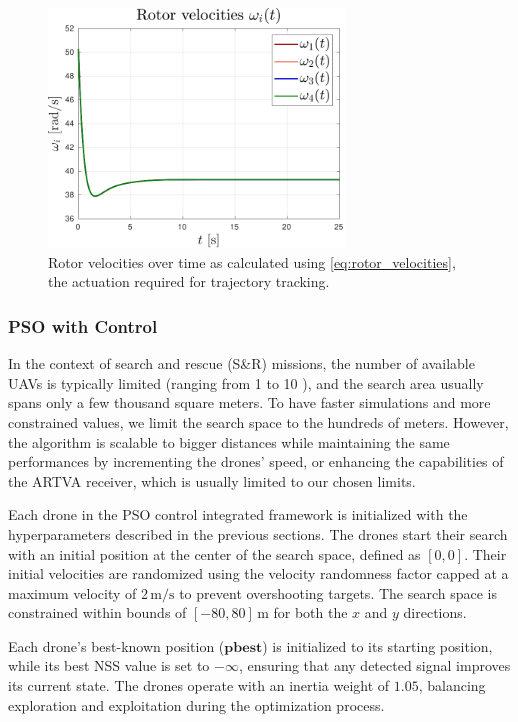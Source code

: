 \documentclass[main]{subfiles}
\begin{document}
\begin{figure}
    \centering
    \includegraphics[width=0.7\textwidth]{images/rotor_velocities.pdf}
    \caption[Rotor Velocities]{Rotor velocities over time as calculated using \eqref{eq:rotor_velocities}, the actuation required for trajectory tracking.}
    \label{fig:rotor_velocities}
\end{figure}

\newpage
\subsubsection{PSO with Control}
In the context of search and rescue (S\&R) missions, the number of available 
UAVs is typically limited (ranging from 1 to 10 \cite{PSO_original}), and 
the search area 
usually spans only a few thousand square meters.
To have faster simulations and more constrained 
values, we limit the search space 
to the hundreds of meters.
However, the algorithm is scalable to bigger distances while maintaining the same
performances by incrementing the drones' speed, or enhancing the capabilities
of the ARTVA receiver, which is usually limited to our chosen limits.

Each drone in the PSO control integrated framework is 
initialized with the hyperparameters described in the previous sections. 
The drones start their search with an initial position at the 
center of the search space, defined as \([0, 0]\). 
Their initial velocities are randomized using the velocity randomness
factor capped at a maximum velocity of \(2 \, \text{m/s}\) 
to prevent overshooting targets. The search space is constrained within bounds 
of \([-80, 80] \, \text{m}\) for both the \(x\) and \(y\) directions.

Each drone's best-known position ($\mathbf{pbest}$) is initialized 
to its starting position, while its best NSS
value is set to \(-\infty\), ensuring that any detected signal improves 
its current state. The drones operate with an inertia weight of \(1.05\), 
balancing exploration and exploitation during the optimization process. 
\end{document}
